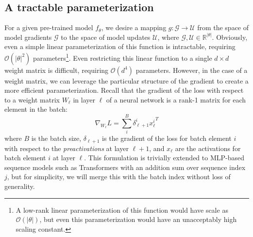 \documentclass{article}
\begin{document}
\subsection{A tractable parameterization}

For a given pre-trained model $f_\theta$, 
we desire a
mapping $g: \mathcal{G} \rightarrow \mathcal{U}$ from the space of model gradients $\mathcal{G}$ to the space of model updates $\mathcal{U}$, where $\mathcal{G},\mathcal{U}\in \mathbb{R}^{|\theta|}$. 
Obviously, even a simple linear parameterization of this function is intractable, requiring $\mathcal{O}(|\theta|^2)$ parameters\footnote{A low-rank linear parameterization of this function would have scale as $\mathcal{O}(|\theta|)$, but even this parameterization would have an unacceptably high scaling constant.}.
Even restricting this linear function to a single $d \times d$ weight matrix is difficult, requiring $\mathcal{O}(d^4)$ parameters.
However, in the case of a weight matrix, we can leverage the particular structure of the gradient to create a more efficient parameterization.
Recall that the gradient of the loss with respect to a weight matrix $W_{\ell}$ in layer $\ell$ of a neural network is a rank-1 matrix for each element in the batch:
\begin{equation}
    \nabla_{W_\ell}L = \sum_i^B\delta_{\ell + 1}^i{x_\ell^i}^T
\end{equation}
where $B$ is the batch size, $\delta_{\ell+1}$ is the gradient of the loss for batch element $i$ with respect to the \textit{preactivations} at layer $\ell+1$, and $x_\ell$ are the activations for batch element $i$ at layer $\ell$. This formulation is trivially extended to MLP-based sequence models such as Transformers \citep{vaswani2017attention,radford2019language} with an addition sum over sequence index $j$, but for simplicity, we will merge this with the batch index without loss of generality.
\end{document}
